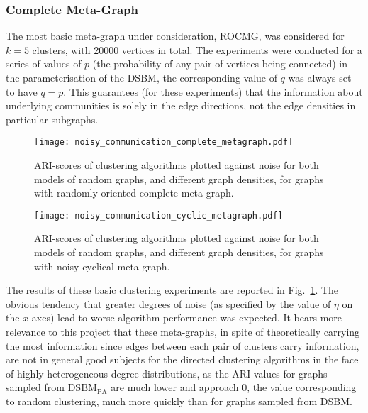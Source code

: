 \subsubsection{Complete Meta-Graph}

The most basic meta-graph under consideration, ROCMG, was considered for $k=5$ clusters, with 
20000 vertices in total. The experiments were 
conducted for a series of values of $p$ (the probability of any pair of vertices being connected) 
in the parameterisation of the DSBM, the corresponding value of $q$ was always set to have $q=p$. 
This guarantees (for these experiments) that the information about underlying communities is 
solely in the edge directions, not the edge densities in particular subgraphs.

\begin{figure}
\begin{center}
\texttt{[image: noisy\_communication\_complete\_metagraph.pdf]}
\end{center}
\caption{ARI-scores of clustering algorithms plotted against noise for both models of random 
graphs, and different graph densities, for graphs with randomly-oriented complete meta-graph.}
\label{fig:basicrocmg}
\end{figure}

\begin{figure}
\begin{center}
\texttt{[image: noisy\_communication\_cyclic\_metagraph.pdf]}
\end{center}
\caption{ARI-scores of clustering algorithms plotted against noise for both models of random 
graphs, and different graph densities, for graphs with noisy cyclical meta-graph.}
\label{fig:basicnoiscyc}
\end{figure}

The results of these basic clustering experiments are reported in Fig.\ \ref{fig:basicrocmg}. The 
obvious tendency that greater degrees of noise (as specified by the value of $\eta$ on the $x$-axes)
 lead to worse algorithm performance was expected. It bears more relevance to this project that 
these meta-graphs, in spite of theoretically carrying the most information since edges between 
each pair of clusters carry information, are not in general good subjects for the directed 
clustering algorithms in the face of highly heterogeneous degree distributions, as the ARI values 
for graphs sampled from $\mathrm{DSBM}_\mathrm{PA}$ are much lower and approach $0$, the 
value corresponding to random clustering, much more quickly than for graphs sampled from DSBM.

